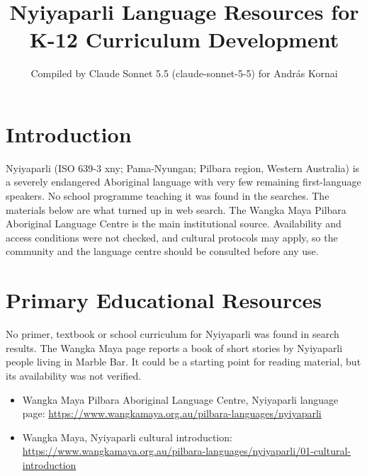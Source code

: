 \documentclass[12pt]{article}
\title{Nyiyaparli Language Resources for K-12 Curriculum Development}
\author{Compiled by Claude Sonnet 5.5 (claude-sonnet-5-5) for Andr\'as Kornai}
\date{}
\begin{document}
\maketitle

\section{Introduction}
Nyiyaparli (ISO 639-3 xny; Pama-Nyungan; Pilbara region, Western Australia) is a severely endangered Aboriginal language with very few remaining first-language speakers. No school programme teaching it was found in the searches. The materials below are what turned up in web search. The Wangka Maya Pilbara Aboriginal Language Centre is the main institutional source. Availability and access conditions were not checked, and cultural protocols may apply, so the community and the language centre should be consulted before any use.

\section{Primary Educational Resources}
No primer, textbook or school curriculum for Nyiyaparli was found in search results. The Wangka Maya page reports a book of short stories by Nyiyaparli people living in Marble Bar. It could be a starting point for reading material, but its availability was not verified.
\begin{itemize}
\item Wangka Maya Pilbara Aboriginal Language Centre, Nyiyaparli language page: \url{https://www.wangkamaya.org.au/pilbara-languages/nyiyaparli}
\item Wangka Maya, Nyiyaparli cultural introduction: \url{https://www.wangkamaya.org.au/pilbara-languages/nyiyaparli/01-cultural-introduction}
\end{itemize}
\end{document}
